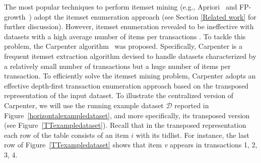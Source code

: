 The most popular techniques to perform itemset mining (e.g.,
Apriori~\cite{Agr94} and FP-growth~\cite{Han00}) adopt the itemset enumeration
approach (see Section \ref{Related work} for further discussion).
However, itemset enumeration revealed to be ineffective with datasets with a
high average number of items per transactions \cite{Zaki_Carpenter}.
To tackle this problem, the Carpenter algorithm~\cite{Zaki_Carpenter} was
proposed.
Specifically, Carpenter is a frequent itemset extraction algorithm devised to
handle datasets characterized by a relatively small number of
transactions but a huge number of items per transaction.
To efficiently solve the itemset mining problem, Carpenter adopts an effective
depth-first transaction enumeration approach based on the transposed
representation of the input dataset.
To illustrate the centralized version of Carpenter, we will use the running
example dataset $\mathcal{D}$ reported in Figure~\ref{horizontalexampledataset},
and
more specifically, its transposed version (see Figure~\ref{TTexampledataset}).
Recall that in the transposed
representation each row of the table consists of an item $i$ with its tidlist.
For instance,
the last row of Figure~\ref{TTexampledataset} shows that item \textit{v}
appears in
transactions 1, 2, 3, 4.


